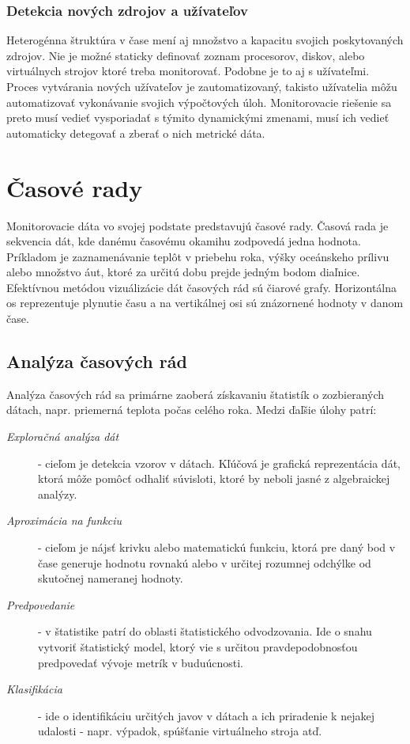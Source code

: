 \documentclass[printed,11pt,twoside,color,cover,table]{fithesis3}
\begin{document}
\subsubsection{Detekcia nových zdrojov a užívateľov}
Heterogénna štruktúra v čase mení aj množstvo a kapacitu svojich poskytovaných zdrojov. Nie je možné staticky definovať zoznam procesorov, diskov, alebo virtuálnych strojov ktoré treba monitorovať. Podobne je to aj s užívateľmi. Proces
vytvárania nových užívateľov je zautomatizovaný, takisto užívatelia môžu automatizovať vykonávanie svojich výpočtových úloh. Monitorovacie riešenie sa preto musí vedieť vysporiadať s týmito dynamickými zmenami, musí ich vedieť 
automaticky detegovať a zberať o nich metrické dáta.

\section{Časové rady}
Monitorovacie dáta vo svojej podstate predstavujú časové rady.
Časová rada je sekvencia dát, kde danému časovému okamihu zodpovedá jedna hodnota. Príkladom je zaznamenávanie teplôt v priebehu roka, výšky oceánskeho prílivu alebo množstvo áut, ktoré za určitú dobu
prejde jedným bodom diaľnice. Efektívnou metódou vizuálizácie dát časových rád sú čiarové grafy. Horizontálna os reprezentuje plynutie času a na vertikálnej osi sú znázornené hodnoty v danom čase.

\subsection{Analýza časových rád}
Analýza časových rád sa primárne zaoberá získavaniu štatistík o zozbieraných dátach, napr. priemerná teplota počas celého roka. Medzi ďaľšie úlohy patrí:
\begin{description}
\item[\emph{Exploračná analýza dát}] - cieľom je detekcia vzorov v dátach. Kľúčová je grafická reprezentácia dát, ktorá môže pomôcť odhaliť súvisloti, ktoré by neboli jasné z algebraickej analýzy.\cite{eda}
\item[\emph{Aproximácia na funkciu}] - cieľom je nájsť krivku alebo matematickú funkciu, ktorá pre daný bod v čase generuje hodnotu rovnakú alebo v určitej rozumnej odchýlke od skutočnej nameranej hodnoty.
\item[\emph{Predpovedanie}] - v štatistike patrí do oblasti štatistického odvodzovania. Ide o snahu vytvoriť štatistický model, ktorý vie s určitou pravdepodobnosťou predpovedať vývoje metrík v buduúcnosti.
\item[\emph{Klasifikácia}] - ide o identifikáciu určitých javov v dátach a ich priradenie k nejakej udalosti - napr. výpadok, spúšťanie virtuálneho stroja atď.                               
\end{description}
\end{document}
